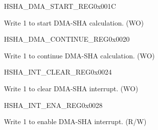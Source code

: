 \begin{register}{H}{SHA\_DMA\_START\_REG}{0x001C}\label{regdesc:SHADMASTARTREG}
%
%
\regnewline%
\begin{regdesc}\begin{reglist}
\label{fielddesc:SHADMASTART}\item [SHA\_DMA\_START] Write 1 to start DMA-SHA calculation. (WO)
\end{reglist}\end{regdesc}
\end{register}


\begin{register}{H}{SHA\_DMA\_CONTINUE\_REG}{0x0020}\label{regdesc:SHADMACONTINUEREG}
%
%
\regnewline%
\begin{regdesc}\begin{reglist}
\label{fielddesc:SHADMACONTINUE}\item [SHA\_DMA\_CONTINUE] Write 1 to continue DMA-SHA calculation. (WO)
\end{reglist}\end{regdesc}
\end{register}


\begin{register}{H}{SHA\_INT\_CLEAR\_REG}{0x0024}\label{regdesc:SHAINTCLEARREG}
%
%
\regnewline%
\begin{regdesc}\begin{reglist}
\label{fielddesc:SHACLEARINTERRUPT}\item [SHA\_CLEAR\_INTERRUPT] Write 1 to clear DMA-SHA interrupt. (WO)
\end{reglist}\end{regdesc}
\end{register}


\begin{register}{H}{SHA\_INT\_ENA\_REG}{0x0028}\label{regdesc:SHAINTENAREG}
%
%
\regnewline%
\begin{regdesc}\begin{reglist}
\label{fielddesc:SHAINTERRUPTENA}\item [SHA\_INTERRUPT\_ENA] Write 1 to enable DMA-SHA interrupt. (R/W)
\end{reglist}\end{regdesc}
\end{register}


